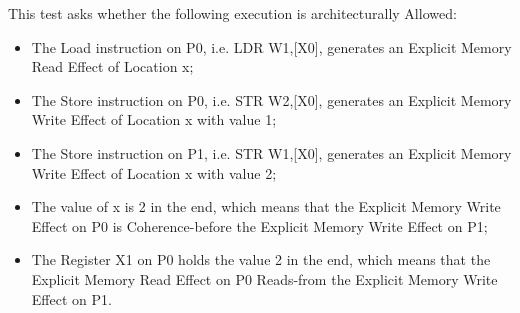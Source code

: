 This test asks whether the following execution is architecturally Allowed:

\begin{itemize}
  \item The Load instruction on P0, i.e. LDR W1,[X0], generates an Explicit Memory Read Effect of Location x;
  \item The Store instruction on P0, i.e. STR W2,[X0], generates an Explicit Memory Write Effect of Location x with value 1;
  \item The Store instruction on P1, i.e. STR W1,[X0], generates an Explicit Memory Write Effect of Location x with value 2;
  \item The value of x is 2 in the end, which means that the Explicit Memory Write Effect on P0 is Coherence-before the Explicit Memory Write Effect on P1;
  \item The Register X1 on P0 holds the value 2 in the end, which means that the Explicit Memory Read Effect on P0 Reads-from the Explicit Memory Write Effect on P1.
\end{itemize}
